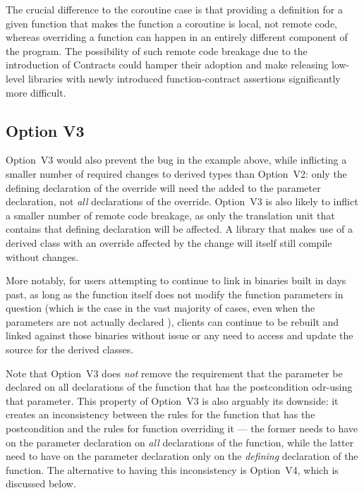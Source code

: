 The crucial difference to the coroutine case is that providing a definition for a given function that makes the function a coroutine is local, not remote code, whereas overriding a function can happen in an entirely different component of the program. The possibility of such remote code breakage due to the introduction of Contracts could hamper their adoption and make releasing low-level libraries with newly introduced function-contract assertions significantly more difficult.

\subsection*{Option V3}

Option~V3 would also prevent the bug in the example above, while inflicting a smaller number of required changes to derived types than Option~V2: only the defining declaration of the override will need the  added to the parameter declaration, not \emph{all} declarations of the override.
Option~V3 is also likely to inflict a smaller number of remote code breakage, as only the translation unit that contains that defining declaration will be affected. A library that makes use of a derived class with an override affected by the change will itself still compile without changes.

More notably, for users attempting to continue to link in binaries built in days past, as long as the function itself does not modify the function parameters in question (which is the case in the vast majority of cases, even when the parameters are not actually declared ), clients can continue to be rebuilt and linked against those binaries without issue or any need to access and update the source for the derived classes.

Note that Option~V3 does \emph{not} remove the requirement that the parameter be declared  on all declarations of the function that has the postcondition odr-using that parameter. This property of Option~V3 is also arguably its downside: it creates an inconsistency between the rules for the function that has the postcondition and the rules for function overriding it --- the former needs to have  on the parameter declaration on \emph{all} declarations of the function, while the latter need to have  on the parameter declaration only on the \emph{defining} declaration of the function. The alternative to having this inconsistency is Option~V4, which is discussed below.

